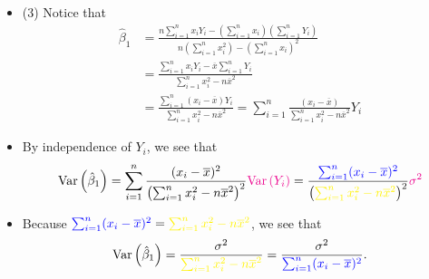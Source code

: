 \begin{frame}[fragile]
\begin{itemize}
	\item[] (3) Notice that
\begin{align*}
	\hat\beta_1 & = \frac{n\sum_{i=1}^n x_iY_i - \left(\sum_{i=1}^n x_i\right)\left(\sum_{i=1}^n Y_i\right)}{n\left(\sum_{i=1}^n x_i^2\right)-\left(\sum_{i=1}^n x_i\right)^2}\\[1em]
	 & = \frac{\sum_{i=1}^n x_i Y_i - \overline{x} \sum_{i=1}^n Y_i}{\sum_{i=1}^n x_i^2 - n \overline{x}^2}\\[1em]
   & = \frac{\sum_{i=1}^n (x_i-\overline{x})Y_i}{\sum_{i=1}^n x_i^2 - n \overline{x}^2}  = \sum_{i=1}^n \frac{ (x_i-\overline{x})}{\sum_{i=1}^n x_i^2 - n \overline{x}^2} Y_i
\end{align*}
\item[]By independence of $Y_i$, we see that
\begin{align*}
 \Var\left(\hat{\beta}_1\right)	= \sum_{i=1}^n \frac{ (x_i-\overline{x})^2}{\left(\sum_{i=1}^n x_i^2 - n \overline{x}^2\right)^2} \textcolor{magenta}{\Var\left(Y_i\right)}
 	=  \frac{\textcolor{blue}{\sum_{i=1}^n (x_i-\overline{x})^2}}{\left(\textcolor{yellow}{\sum_{i=1}^n x_i^2 - n \overline{x}^2}\right)^2} \textcolor{magenta}{\sigma^2}
\end{align*}
\item[] Because $\textcolor{blue}{\sum_{i=1}^n (x_i-\overline{x})^2} = \textcolor{yellow}{\sum_{i=1}^n x_i^2 - n\overline{x}^2}$, we see that
\begin{align*}
 \Var\left(\hat{\beta}_1\right)	= \frac{\sigma^2}{\textcolor{yellow}{\sum_{i=1}^n x_i^2 - n \overline{x}^2}} = \frac{\sigma^2}{\textcolor{blue}{\sum_{i=1}^n (x_i-\overline{x})^2}}.
\end{align*}
\end{itemize}
\end{frame}
